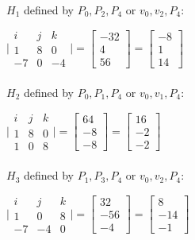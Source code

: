 \documentclass{article}
\begin{document}
\begin{enumerate}
        \paragraph{} $H_1$ defined by $P_0,P_2,P_4$ or $v_0, v_2, P_4$:

        $ \Bigg | \begin{matrix}
            i & j & k \\
            1 & 8 & 0 \\
            -7 & 0 & -4
        \end{matrix} \Bigg | = \begin{bmatrix}  - 32 \\ 4 \\ 56 \end{bmatrix} = \begin{bmatrix}  - 8 \\ 1 \\ 14 \end{bmatrix}$

        \paragraph{} $H_2$ defined by $P_0,P_1,P_4$ or $v_0, v_1, P_4$:

        $ \Bigg | \begin{matrix}
            i & j & k \\
            1 & 8 & 0 \\
            1 & 0 & 8
        \end{matrix} \Bigg | = \begin{bmatrix} 64 \\ -8 \\ -8 \end{bmatrix} = \begin{bmatrix} 16 \\ -2 \\ -2 \end{bmatrix}$

        \paragraph{} $H_3$ defined by $P_1,P_3,P_4$ or $v_0, v_2, P_4$:

        $ \Bigg | \begin{matrix}
            i & j & k \\
            1 & 0 & 8 \\
            -7 & -4 & 0
        \end{matrix} \Bigg | = \begin{bmatrix} 32 \\ -56 \\ -4 \end{bmatrix} = \begin{bmatrix}  8 \\ -14 \\ -1 \end{bmatrix}$


\end{enumerate}
\end{document}
